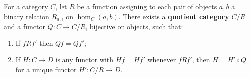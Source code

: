 For a category $C$, let $R$ be a function assigning to each pair of objects $a, b$ a binary relation $R_{a,b}$ on $\hom_C(a,b)$. There exists a \textbf{quotient category} $C/R$ and a functor $Q: C \rightarrow C/R$, bijective on objects, such that:
\begin{enumerate}
\item If $f R f'$ then $Qf = Qf'$;
\item If $H: C \rightarrow D$ is any functor with $Hf = Hf'$ whenever $f R f'$, then $H = H' \circ Q$ for a unique functor $H': C/R \rightarrow D$.
\end{enumerate}
